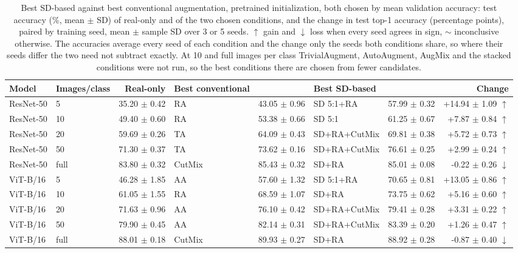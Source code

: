 \begin{table}[H]
\centering
\small
\setlength{\tabcolsep}{4pt}
\caption{Best SD-based against best conventional augmentation, pretrained initialization, both chosen by mean validation accuracy: test accuracy (\%, mean $\pm$ SD) of real-only and of the two chosen conditions, and the change in test top-1 accuracy (percentage points), paired by training seed, mean $\pm$ sample SD over 3 or 5 seeds. $\uparrow$ gain and $\downarrow$ loss when every seed agrees in sign, $\sim$ inconclusive otherwise. The accuracies average every seed of each condition and the change only the seeds both conditions share, so where their seeds differ the two need not subtract exactly. At 10 and full images per class TrivialAugment, AutoAugment, AugMix and the stacked conditions were not run, so the best conditions there are chosen from fewer candidates.}
\label{tab:augment-best-pretrained-test}
\begin{tabular}{llrlrlrr}
\toprule
Model & Images/class & Real-only & Best conventional & & Best SD-based & & Change \\
\midrule
ResNet-50 & 5 & 35.20 $\pm$ 0.42 & RA & 43.05 $\pm$ 0.96 & SD 5:1+RA & 57.99 $\pm$ 0.32 & +14.94 $\pm$ 1.09 $\uparrow$ \\
ResNet-50 & 10 & 49.40 $\pm$ 0.60 & RA & 53.38 $\pm$ 0.66 & SD 5:1 & 61.25 $\pm$ 0.67 & +7.87 $\pm$ 0.84 $\uparrow$ \\
ResNet-50 & 20 & 59.69 $\pm$ 0.26 & TA & 64.09 $\pm$ 0.43 & SD+RA+CutMix & 69.81 $\pm$ 0.38 & +5.72 $\pm$ 0.73 $\uparrow$ \\
ResNet-50 & 50 & 71.30 $\pm$ 0.37 & TA & 73.62 $\pm$ 0.16 & SD+RA+CutMix & 76.61 $\pm$ 0.25 & +2.99 $\pm$ 0.24 $\uparrow$ \\
ResNet-50 & full & 83.80 $\pm$ 0.32 & CutMix & 85.43 $\pm$ 0.32 & SD+RA & 85.01 $\pm$ 0.08 & -0.22 $\pm$ 0.26 $\downarrow$ \\
ViT-B/16 & 5 & 46.28 $\pm$ 1.85 & AA & 57.60 $\pm$ 1.32 & SD 5:1+RA & 70.65 $\pm$ 0.81 & +13.05 $\pm$ 0.86 $\uparrow$ \\
ViT-B/16 & 10 & 61.05 $\pm$ 1.55 & RA & 68.59 $\pm$ 1.07 & SD+RA & 73.75 $\pm$ 0.62 & +5.16 $\pm$ 0.60 $\uparrow$ \\
ViT-B/16 & 20 & 71.63 $\pm$ 0.96 & AA & 76.10 $\pm$ 0.42 & SD+RA+CutMix & 79.41 $\pm$ 0.28 & +3.31 $\pm$ 0.22 $\uparrow$ \\
ViT-B/16 & 50 & 79.90 $\pm$ 0.45 & AA & 82.14 $\pm$ 0.31 & SD+RA+CutMix & 83.39 $\pm$ 0.20 & +1.26 $\pm$ 0.47 $\uparrow$ \\
ViT-B/16 & full & 88.01 $\pm$ 0.18 & CutMix & 89.93 $\pm$ 0.27 & SD+RA & 88.92 $\pm$ 0.28 & -0.87 $\pm$ 0.40 $\downarrow$ \\
\bottomrule
\end{tabular}
\end{table}
